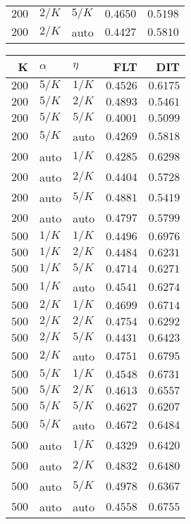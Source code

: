 \begin{table}
\begin{spacing}{1.2}
{\begin{tabular}{rll|rr}
$200$ &  $2/K$ &  $5/K$ &         $0.4650$ & $0.5198$ \\
$200$ &  $2/K$ &   auto &         $0.4427$ & $0.5810$ \\
\bottomrule
\end{tabular}
} \hfill \parbox{.45\linewidth}{\centering \begin{tabular}{rll|rr}
\toprule
    K &  $\alpha$ &    $\eta$ & FLT &        DIT \\
\midrule
$200$ &  $5/K$ &  $1/K$ &         $0.4526$ &      $0.6175$ \\
$200$ &  $5/K$ &  $2/K$ &         $0.4893$ &      $0.5461$ \\
$200$ &  $5/K$ &  $5/K$ &         $0.4001$ &      $0.5099$ \\
$200$ &  $5/K$ &   auto &         $0.4269$ &      $0.5818$ \\
$200$ &   auto &  $1/K$ &         $0.4285$ &      $0.6298$ \\
$200$ &   auto &  $2/K$ &         $0.4404$ &      $0.5728$ \\
$200$ &   auto &  $5/K$ &         $0.4881$ &      $0.5419$ \\
$200$ &   auto &   auto &         $0.4797$ &      $0.5799$ \\
$500$ &  $1/K$ &  $1/K$ &         $0.4496$ & $\bm{0.6976}$ \\
$500$ &  $1/K$ &  $2/K$ &         $0.4484$ &      $0.6231$ \\
$500$ &  $1/K$ &  $5/K$ &         $0.4714$ &      $0.6271$ \\
$500$ &  $1/K$ &   auto &         $0.4541$ &      $0.6274$ \\
$500$ &  $2/K$ &  $1/K$ &         $0.4699$ &      $0.6714$ \\
$500$ &  $2/K$ &  $2/K$ &         $0.4754$ &      $0.6292$ \\
$500$ &  $2/K$ &  $5/K$ &         $0.4431$ &      $0.6423$ \\
$500$ &  $2/K$ &   auto &         $0.4751$ &      $0.6795$ \\
$500$ &  $5/K$ &  $1/K$ &         $0.4548$ &      $0.6731$ \\
$500$ &  $5/K$ &  $2/K$ &         $0.4613$ &      $0.6557$ \\
$500$ &  $5/K$ &  $5/K$ &         $0.4627$ &      $0.6207$ \\
$500$ &  $5/K$ &   auto &         $0.4672$ &      $0.6484$ \\
$500$ &   auto &  $1/K$ &         $0.4329$ &      $0.6420$ \\
$500$ &   auto &  $2/K$ &         $0.4832$ &      $0.6480$ \\
$500$ &   auto &  $5/K$ &    $\bm{0.4978}$ &      $0.6367$ \\
$500$ &   auto &   auto &         $0.4558$ &      $0.6755$ \\
\bottomrule
\end{tabular}
}
\end{spacing}
\end{table}

